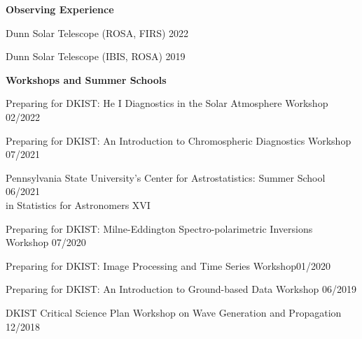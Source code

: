 \documentclass{resume} %
\begin{document}
\vspace{-0.1in}
\begin{rSection}{\textbf{Observing Experience}}
\vspace{0.02in}

{Dunn Solar Telescope (ROSA, FIRS)} \hfill{2022}

{Dunn Solar Telescope (IBIS, ROSA)} \hfill{2019}

\end{rSection} 
\newpage



\vspace{-0.1in}
\begin{rSection}{\textbf{Workshops and Summer Schools}}
\vspace{0.02in}

{Preparing for DKIST: He I Diagnostics in the Solar Atmosphere Workshop \hfill{02/2022}} 

{Preparing for DKIST: An Introduction to Chromospheric Diagnostics Workshop} \hfill{07/2021}

{Pennsylvania State University's Center for Astrostatistics: Summer School \hfill{06/2021} \\ in Statistics for Astronomers XVI}

{Preparing for DKIST: Milne-Eddington Spectro-polarimetric Inversions Workshop \hfill{07/2020}}

{Preparing for DKIST: Image Processing and Time Series Workshop\hfill{01/2020}}

{Preparing for DKIST: An Introduction to Ground-based Data  Workshop \hfill{06/2019}}

{DKIST Critical Science Plan Workshop on 
Wave Generation and Propagation \hfill{12/2018}}
\end{rSection} 


\end{document}
